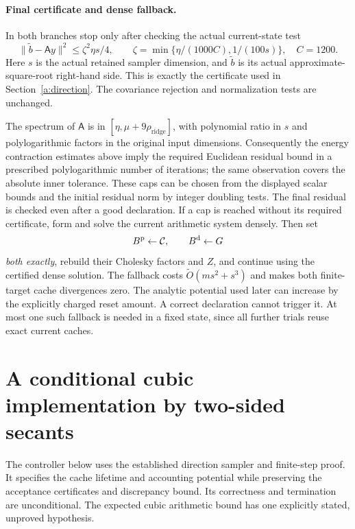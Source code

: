 \documentclass[11pt]{amsart}
\theoremstyle{definition}\newtheorem{definition}[theorem]{Definition}
\theoremstyle{remark}\newtheorem{remark}[theorem]{Remark}
\numberwithin{equation}{section}
\begin{document}
\paragraph{Final certificate and dense fallback.}\label{c:failure}
In both branches stop only after checking the actual current-state test
\begin{equation}\label{c:finalresidual}
 \|\widetilde b-\mathsf Ay\|^2\le\zeta^2\eta s/4,
 \qquad\zeta=\min\{\eta/(1000C),1/(100s)\},\quad C=1200.
\end{equation}
Here $s$ is the actual retained sampler dimension, and $\widetilde b$ is its actual approximate-square-root right-hand side.
This is exactly the certificate used in Section~\ref{a:direction}.
The covariance rejection and normalization tests are unchanged.

The spectrum of $\mathsf A$ is in
$[\eta,\mu+9\rho_{\mathrm{ridge}}]$, with polynomial ratio in
$s$ and polylogarithmic factors in the original input dimensions.
Consequently the energy contraction estimates above imply the required
Euclidean residual bound in a prescribed polylogarithmic number of
iterations; the same observation covers the absolute inner tolerance.
These caps can be chosen from the displayed scalar bounds and the initial
residual norm by integer doubling tests. The final residual is checked even after a good declaration.
If a cap is reached without its required certificate, form and solve the
current arithmetic system densely. Then set
\[
 B^{\rm p}\leftarrow \mathcal C,\qquad B^{\rm d}\leftarrow G
\]
\emph{both exactly}, rebuild their Cholesky factors and $Z$, and continue
using the certified dense solution. The fallback costs
$\widetilde O(ms^2+s^3)$ and makes both finite-target cache divergences zero. The analytic
potential used later can increase by the explicitly charged reset amount.
A correct declaration cannot trigger it. At most one such fallback is
needed in a fixed state, since all further trials reuse exact current
caches.



\section{A conditional cubic implementation by two-sided secants}
\label{d:section}

The controller below uses the established direction sampler and finite-step
proof. It specifies the cache lifetime and accounting potential while preserving
the acceptance certificates and discrepancy bound. Its correctness and
termination are unconditional. The expected cubic arithmetic bound has
one explicitly stated, unproved hypothesis.
\end{document}
